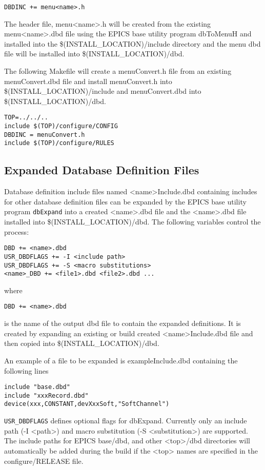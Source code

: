 \begin{verbatim}DBDINC += menu<name>.h
\end{verbatim}The header file, menu\textless{}name\textgreater{}.h will be created from the existing menu\textless{}name\textgreater{}.dbd file using the EPICS base utility 
program dbToMenuH and installed into the \$(INSTALL\_LOCATION)/include directory and the menu dbd file will be 
installed into \$(INSTALL\_LOCATION)/dbd.

The following Makefile will create a menuConvert.h file from an existing menuConvert.dbd file and install 
menuConvert.h into \$(INSTALL\_LOCATION)/include and menuConvert.dbd into \$(INSTALL\_LOCATION)/dbd.

\begin{verbatim}TOP=../../..
include $(TOP)/configure/CONFIG
DBDINC = menuConvert.h
include $(TOP)/configure/RULES
\end{verbatim}\subsection{Expanded Database Definition Files}

Database definition include files named \textless{}name\textgreater{}Include.dbd containing includes for other database definition files can be 
expanded by the EPICS base utility program \verb|dbExpand| into a created \textless{}name\textgreater{}.dbd file and the \textless{}name\textgreater{}.dbd file installed 
into \$(INSTALL\_LOCATION)/dbd. The following variables control the process:

\begin{verbatim}DBD += <name>.dbd
USR_DBDFLAGS += -I <include path>
USR_DBDFLAGS += -S <macro substitutions>
<name>_DBD += <file1>.dbd <file2>.dbd ...
\end{verbatim}
where 

\begin{verbatim}DBD += <name>.dbd
\end{verbatim}is the name of the output dbd file to contain the expanded definitions. It is created by expanding an existing or build          
created \textless{}name\textgreater{}Include.dbd file and then copied into \$(INSTALL\_LOCATION)/dbd.

An example of a file to be expanded is exampleInclude.dbd containing the following lines

\begin{verbatim}include "base.dbd"
include "xxxRecord.dbd"
device(xxx,CONSTANT,devXxxSoft,"SoftChannel")
\end{verbatim}\verb|USR_DBDFLAGS| defines optional flags for dbExpand. Currently only an include path (-I \textless{}path\textgreater{}) and macro substitution 
(-S \textless{}substitution\textgreater{}) are supported. The include paths for EPICS base/dbd, and other \textless{}top\textgreater{}/dbd directories will 
automatically be added during the build if the \textless{}top\textgreater{} names are specified in the configure/RELEASE file.

